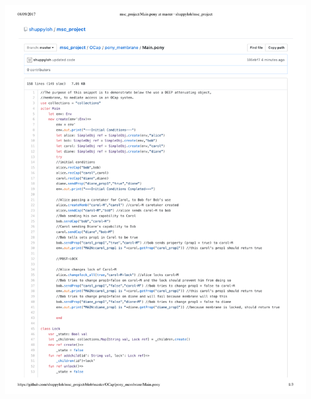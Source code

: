 \documentclass[a4paper,11pt,twoside]{article}
\begin{document}
{\begin{minipage}{\textwidth}
\includegraphics[width=\textwidth,valign=t,page=2]{figures/code_Membrane.pdf}
\end{minipage}\clearpage
\begin{minipage}{\textwidth}

\end{minipage}}
\end{document}
